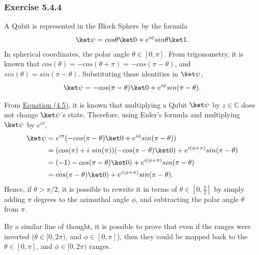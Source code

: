 \subsubsection{Exercise 5.4.4}
\label{sec:noson-exercise-5-4-4}
A Qubit is represented in the Bloch Sphere by the formula
\begin{align}
    \ket \psi = cos \theta \ket 0 + e^{i \phi} sin \theta \ket 1 .
\end{align}
In spherical coordinates, the polar angle $\theta \in [0, \pi]$.
From trigonometry, it is known that
$cos(\theta) = - cos(\theta + \pi) = - cos(\pi - \theta)$, and
$sin(\theta) = sin(\pi - \theta)$.
Substituting these identities in $\ket \psi$,
\begin{align}
    \ket \psi = -cos (\pi - \theta) \ket 0 + e^{i\phi} sin(\pi - \theta) .
\end{align}

From \hyperref[sec:noson-equation-4-5]{Equation (4.5)}, it is known that
multiplying a Qubit $\ket \psi$ by $z \in \mathbb{C}$ does not change
$\ket \psi$'s state.
Therefore, using Euler's formula and multiplying $\ket \psi$ by $e^{i \pi}$,
\begin{align}
    \ket \psi &= e^{i \pi} (-cos (\pi - \theta) \ket 0 + e^{i\phi} sin(\pi - \theta)) \\
        &= (cos (\pi) + i\ sin(\pi)) (-cos (\pi - \theta) \ket 0) +
            e^{i (\phi + \pi)} sin(\pi - \theta) \\
        &= (-1) -cos (\pi - \theta) \ket 0) +
            e^{i (\phi + \pi)} sin(\pi - \theta) \\
        &= cos (\pi - \theta) \ket 0) + e^{i (\phi + \pi)} sin(\pi - \theta) .
\end{align}
Hence, if $\theta > \pi / 2$, it is possible to rewrite it in terms of
$\theta \in [0, \frac \pi 2]$ by simply adding $\pi$ degrees to the
azimuthal angle $\phi$,
and subtracting the polar angle $\theta$ from $\pi$.

By a similar line of thought, it is possible to prove that even if the ranges were inverted
($\theta \in [0, 2\pi)$, and $\phi \in [0, \pi]$),
then they could be mapped back to the $\theta \in [0, \pi]$, and $\phi \in [0, 2\pi)$ ranges.